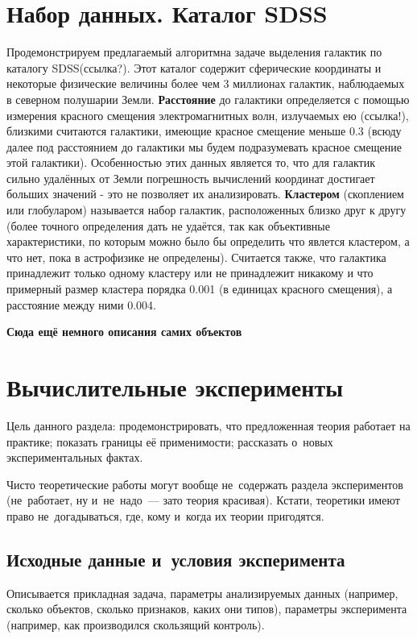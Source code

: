 \documentclass[12pt,fleqn]{article}
\begin{document}
\section{Набор данных. Каталог SDSS}

Продемонстрируем предлагаемый алгоритмна задаче выделения галактик по каталогу SDSS(ссылка?). Этот каталог содержит сферические координаты и некоторые физические величины более чем 3 миллионах галактик, наблюдаемых в северном полушарии Земли. \textbf{Расстояние} до галактики определяется с помощью измерения красного смещения электромагнитных волн, излучаемых ею (ссылка!), близкими считаются галактики, имеющие красное смещение меньше 0.3 (всюду далее под расстоянием до галактики мы будем подразумевать красное смещение этой галактики). Особенностью этих данных является то, что для галактик сильно удалённых от Земли погрешность вычислений координат достигает больших значений - это не позволяет их анализировать. \textbf{Кластером} (скоплением или глобуларом) называется набор галактик, расположенных близко друг к другу (более точного определения дать не удаётся, так как объективные характеристики, по которым можно было бы определить что явлется кластером, а что нет, пока в астрофизике не определены). Считается также, что галактика принадлежит только одному кластеру или не принадлежит никакому и что примерный размер кластера порядка 0.001 (в единицах красного смещения), а расстояние между ними 0.004.

\textbf{Сюда ещё немного описания самих объектов}

\section{Вычислительные эксперименты}

Цель данного раздела:
продемонстрировать, что предложенная теория работает на практике;
показать границы её применимости;
рассказать о~новых экспериментальных фактах.

Чисто теоретические работы могут вообще не~содержать раздела экспериментов
(не~работает, ну и~не~надо~--- зато теория красивая).
Кстати, теоретики имеют право не~догадываться, где, кому и~когда их теории пригодятся.

\subsection{Исходные данные и~условия эксперимента}
Описывается прикладная задача, параметры анализируемых данных
(например, сколько объектов, сколько признаков, каких они типов),
параметры эксперимента
(например, как производился скользящий контроль).
\end{document}
